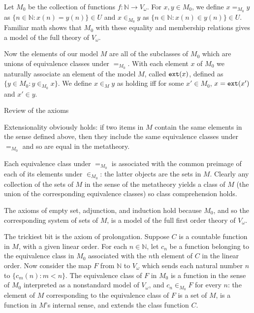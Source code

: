 \documentclass{slides}
\begin{document}
\begin{slide}

Let $M_0$ be the collection of functions \newline $f:\mathbb N \rightarrow V_\omega$.  For $x,y \in M_0$, we
define \newline $x =_{M_0} y$ as $\{n \in \mathbb N:x(n) = y(n)\} \in U$ \newline and $x \in_{M_0} y$ as $\{n \in \mathbb N:x(n) \in y(n)\} \in U$.
Familiar math shows that $M_0$ with these equality and membership relations gives a model of the full theory of $V_\omega$.

Now the elements of our model $M$ are all of the subclasses of $M_0$ which are unions of equivalence classes
under $=_{M_0}$.  With each element $x$ of $M_0$ we naturally associate an element of the model $M$, called ${\tt ext}(x)$, defined as \newline $\{y \in M_0:y \in_{M_0} x\}$.  We define $x \in_M y$ as holding iff for some $x'\in M_0$, \newline $x = {\tt ext}(x')$ and $x' \in y$.


\end{slide}

\begin{slide}

{\Large Review of the axioms}

Extensionality obviously holds:  if two items in $M$ contain the same elements in the sense defined above,
then they include the same equivalence classes under $=_{M_0}$ and so are equal in the metatheory.

Each equivalence class under $=_{M_0}$ is associated with the common preimage of each of its elements under $\in_{M_0}$:  the latter objects are the sets in $M$.  Clearly any collection of the sets of $M$ in the sense of the metatheory yields a class of $M$ (the union of the corresponding equivalence classes) so class comprehension holds.

The axioms of empty set, adjunction, and induction hold because $M_0$, and so the corresponding system of sets of $M$, is a model of the full first order theory of $V_\omega$.

\end{slide}

\begin{slide}

The trickiest bit is the axiom of prolongation.  Suppose $C$ is a countable function in $M$, with a given linear order.  For each $n \in \mathbb N$, let $c_n$ be a function belonging to the equivalence class in $M_0$ associated with the $n$th element of $C$ in the linear order.  Now consider the map $F$ from $\mathbb N$ to $V_\omega$ which sends each natural number $n$ to
$\{c_m(n):m<n\}$.  The equivalence class of $F$ in $M_0$ is a function in the sense of $M_0$ interpreted as a nonstandard model of $V_\omega$, and $c_n \in_{M_0} F$ for every $n$:  the element of $M$ corresponding to the equivalence class of $F$ is a set of $M$, is a function in $M$'s internal sense, and extends the class function $C$.

\end{slide}
\end{document}
